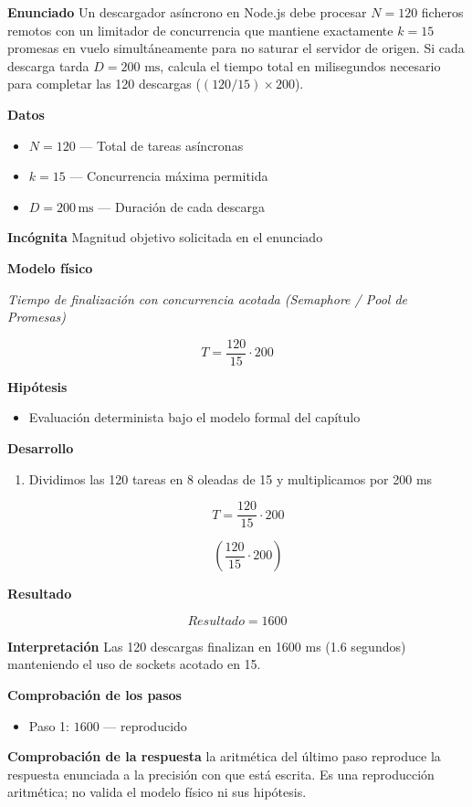 \documentclass{book}
\begin{document}
\begin{tcolorbox}[title={Problema resuelto}, studiumworked, breakable]

\noindent\textbf{Enunciado}
Un descargador asíncrono en Node.js debe procesar \(N = 120\) ficheros remotos con un limitador de concurrencia que mantiene exactamente \(k = 15\) promesas en vuelo simultáneamente para no saturar el servidor de origen. Si cada descarga tarda \(D = 200\text{ ms}\), calcula el tiempo total en milisegundos necesario para completar las 120 descargas (\((120 / 15) \times 200\)).

\noindent\textbf{Datos}
\begin{itemize}
\item $N = 120$ — Total de tareas asíncronas
\item $k = 15$ — Concurrencia máxima permitida
\item $D = 200\,\mathrm{ms}$ — Duración de cada descarga
\end{itemize}

\noindent\textbf{Incógnita}
Magnitud objetivo solicitada en el enunciado

\noindent\textbf{Modelo físico}

\noindent\textit{Tiempo de finalización con concurrencia acotada (Semaphore / Pool de Promesas)}

\[
T = \frac{120}{15} \cdot 200
\]

\noindent\textbf{Hipótesis}
\begin{itemize}
\item Evaluación determinista bajo el modelo formal del capítulo
\end{itemize}

\noindent\textbf{Desarrollo}
\begin{enumerate}
\item
Dividimos las 120 tareas en 8 oleadas de 15 y multiplicamos por 200 ms

\[
T = \frac{120}{15} \cdot 200
\]

\[
\left(\frac{120}{15}\cdot 200\right)
\]
\end{enumerate}

\noindent\textbf{Resultado}

\[
Resultado = 1600
\]

\noindent\textbf{Interpretación}
Las 120 descargas finalizan en 1600 ms (1.6 segundos) manteniendo el uso de sockets acotado en 15.

\noindent\textbf{Comprobación de los pasos}
\begin{itemize}
\item Paso 1: $1600$ — reproducido
\end{itemize}

\noindent\textbf{Comprobación de la respuesta} la aritmética del último paso reproduce la respuesta enunciada a la precisión con que está escrita. Es una reproducción aritmética; no valida el modelo físico ni sus hipótesis.
\end{tcolorbox}
\end{document}
